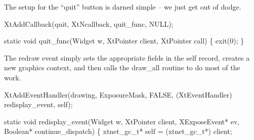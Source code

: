 \nwendcode{}\nwdocspar

The setup for the ``quit'' button is darned simple -- we just get
out of dodge.

\nwenddocs{}\endmoddef\nwstartdeflinemarkup{}\nwenddeflinemarkup
XtAddCallback(quit, XtNcallback, quit_func, NULL);
\nwendcode{}\nwdocspar

\nwenddocs{}\plusendmoddef\nwstartdeflinemarkup{}\nwenddeflinemarkup
static void quit_func(Widget w, XtPointer client, XtPointer call)
\{
    exit(0);
\}

\nwendcode{}\nwdocspar

The redraw event simply sets the appropriate fields in the {\Tt{}self\nwendquote}
record, creates a new graphics context, and then calls the 
{\Tt{}draw{\_}all\nwendquote} routine to do most of the work.

\nwenddocs{}\plusendmoddef\nwstartdeflinemarkup{}\nwenddeflinemarkup
XtAddEventHandler(drawing, ExposureMask, FALSE,
                  (XtEventHandler) redisplay_event, self);
\nwendcode{}\nwdocspar

\nwenddocs{}\plusendmoddef\nwstartdeflinemarkup{}\nwenddeflinemarkup
static void redisplay_event(Widget w, XtPointer client, XExposeEvent* ev,
                            Boolean* continue_dispatch)
\{
    xtnet_gc_t* self = (xtnet_gc_t*) client;

